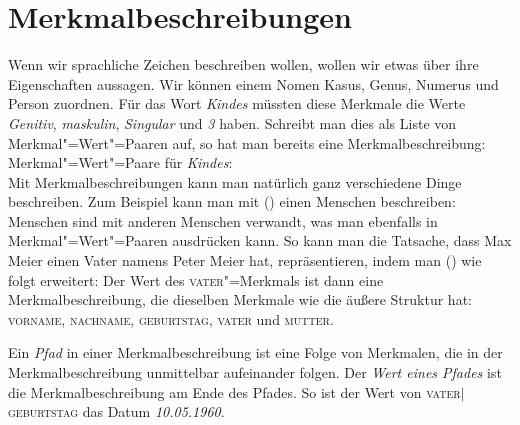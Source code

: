 \section{Merkmalbeschreibungen}

Wenn wir sprachliche Zeichen beschreiben wollen, wollen wir etwas über ihre Eigenschaften
aussagen. Wir können \zb einem Nomen Kasus, Genus, Numerus und Person zuordnen. Für das
Wort \emph{Kindes} müssten diese Merkmale die Werte \emph{Genitiv}, \emph{maskulin}, \emph{Singular} und \emph{3} haben.
Schreibt man dies als Liste von Merkmal"=Wert"=Paaren auf, so hat man bereits eine Merkmalbeschreibung:
\ea
Merkmal"=Wert"=Paare für \emph{Kindes}:\\
\z
Mit Merkmalbeschreibungen kann man natürlich ganz verschiedene Dinge beschreiben. Zum Beispiel kann
man mit () einen Menschen beschreiben:
\ea
{}
\z
Menschen sind mit anderen Menschen verwandt, was man ebenfalls in Merkmal"=Wert"=Paaren
ausdrücken kann. So kann man \zb die Tatsache, dass Max Meier einen Vater namens Peter
Meier hat, repräsentieren, indem man () wie folgt erweitert:
\ea
{}
\z
Der Wert des \textsc{vater}"=Merkmals ist dann eine Merkmalbeschreibung, die dieselben Merkmale
wie die äußere Struktur hat: \textsc{vorname}, \textsc{nachname}, \textsc{geburtstag},
\textsc{vater} und \textsc{mutter}.

Ein \emph{Pfad} in einer Merkmalbeschreibung ist eine Folge von Merkmalen, 
die in der Merkmalbeschreibung unmittelbar aufeinander folgen.
Der \emph{Wert eines Pfades} ist die Merkmalbeschreibung am Ende des Pfades. So ist
der Wert von \textsc{vater$|$geburtstag} das Datum \emph{10.05.1960}.

